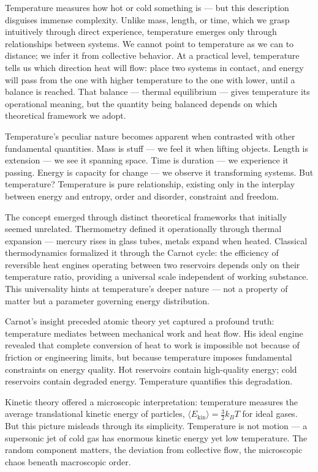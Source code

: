 
Temperature measures how hot or cold something is — but this description disguises immense complexity. Unlike mass, length, or time, which we grasp intuitively through direct experience, temperature emerges only through relationships between systems. We cannot point to temperature as we can to distance; we infer it from collective behavior. At a practical level, temperature tells us which direction heat will flow: place two systems in contact, and energy will pass from the one with higher temperature to the one with lower, until a balance is reached. That balance — thermal equilibrium — gives temperature its operational meaning, but the quantity being balanced depends on which theoretical framework we adopt.

Temperature's peculiar nature becomes apparent when contrasted with other fundamental quantities. Mass is stuff — we feel it when lifting objects. Length is extension — we see it spanning space. Time is duration — we experience it passing. Energy is capacity for change — we observe it transforming systems. But temperature? Temperature is pure relationship, existing only in the interplay between energy and entropy, order and disorder, constraint and freedom.

The concept emerged through distinct theoretical frameworks that initially seemed unrelated. Thermometry defined it operationally through thermal expansion — mercury rises in glass tubes, metals expand when heated. Classical thermodynamics formalized it through the Carnot cycle: the efficiency of reversible heat engines operating between two reservoirs depends only on their temperature ratio, providing a universal scale independent of working substance. This universality hints at temperature's deeper nature — not a property of matter but a parameter governing energy distribution.

Carnot's insight preceded atomic theory yet captured a profound truth: temperature mediates between mechanical work and heat flow. His ideal engine revealed that complete conversion of heat to work is impossible not because of friction or engineering limits, but because temperature imposes fundamental constraints on energy quality. Hot reservoirs contain high-quality energy; cold reservoirs contain degraded energy. Temperature quantifies this degradation.

Kinetic theory offered a microscopic interpretation: temperature measures the average translational kinetic energy of particles, $ \langle E_{\text{kin}} \rangle = \frac{3}{2}k_B T $ for ideal gases. But this picture misleads through its simplicity. Temperature is not motion — a supersonic jet of cold gas has enormous kinetic energy yet low temperature. The random component matters, the deviation from collective flow, the microscopic chaos beneath macroscopic order.

